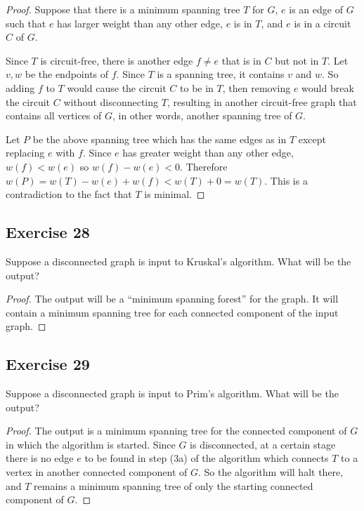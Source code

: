 \documentclass[14pt]{extarticle}
\begin{document}
\begin{proof}
Suppose that there is a minimum spanning tree \(T\) for \(G\), \(e\) is an edge of \(G\) such that \(e\) has larger weight 
than any other edge, \(e\) is in \(T\), and \(e\) is in a circuit \(C\) of \(G\). 

Since \(T\) is circuit-free, there is another edge \(f \neq e\) that is in \(C\) but not in \(T\). Let \(v, w\) be the 
endpoints of \(f\). Since \(T\) is a spanning tree, it contains \(v\) and \(w\). So adding \(f\) to \(T\) would cause 
the circuit \(C\) to be in \(T\), then removing \(e\) would break the circuit \(C\) without disconnecting \(T\), resulting 
in another circuit-free graph that contains all vertices of \(G\), in other words, another spanning tree of \(G\).

Let \(P\) be the above spanning tree which has the same edges as in \(T\) except replacing \(e\) with \(f\). Since \(e\) has 
greater weight than any other edge, \(w(f) < w(e)\) so \(w(f) - w(e) < 0\). Therefore \(w(P) = w(T) - w(e) + w(f) < w(T) + 0 
= w(T)\). This is a contradiction to the fact that \(T\) is minimal. 
\end{proof}

\subsection{Exercise 28}
Suppose a disconnected graph is input to Kruskal’s algorithm. What will be the output?

\begin{proof}
The output will be a “minimum spanning forest” for the graph. It will contain a minimum spanning tree for each connected 
component of the input graph.
\end{proof}

\subsection{Exercise 29}
Suppose a disconnected graph is input to Prim’s algorithm. What will be the output?

\begin{proof}
The output is a minimum spanning tree for the connected component of \(G\) in which the algorithm is started. Since 
\(G\) is disconnected, at a certain stage there is no edge \(e\) to be found in step (3a) of the algorithm which connects 
\(T\) to a vertex in another connected component of \(G\). So the algorithm will halt there, and \(T\) remains a minimum 
spanning tree of only the starting connected component of \(G\).
\end{proof}
\end{document}

